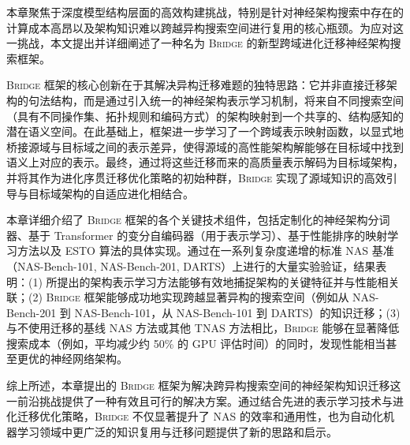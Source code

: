 \documentclass[../main.tex]{subfiles}
\begin{document}
\label{sec:ch4-10-chapter-summary}

本章聚焦于深度模型结构层面的高效构建挑战，特别是针对神经架构搜索中存在的计算成本高昂以及架构知识难以跨越异构搜索空间进行复用的核心瓶颈。为应对这一挑战，本文提出并详细阐述了一种名为 \textsc{Bridge} 的新型跨域进化迁移神经架构搜索框架。

\textsc{Bridge} 框架的核心创新在于其解决异构迁移难题的独特思路：它并非直接迁移架构的句法结构，而是通过引入统一的神经架构表示学习机制，将来自不同搜索空间（具有不同操作集、拓扑规则和编码方式）的架构映射到一个共享的、结构感知的潜在语义空间。在此基础上，框架进一步学习了一个跨域表示映射函数，以显式地桥接源域与目标域之间的表示差异，使得源域的高性能架构解能够在目标域中找到语义上对应的表示。最终，通过将这些迁移而来的高质量表示解码为目标域架构，并将其作为进化序贯迁移优化策略的初始种群，\textsc{Bridge} 实现了源域知识的高效引导与目标域架构的自适应进化相结合。

本章详细介绍了 \textsc{Bridge} 框架的各个关键技术组件，包括定制化的神经架构分词器、基于 Transformer 的变分自编码器（用于表示学习）、基于性能排序的映射学习方法以及 ESTO 算法的具体实现。通过在一系列复杂度递增的标准 NAS 基准（NAS-Bench-101, NAS-Bench-201, DARTS）上进行的大量实验验证，结果表明：(1) 所提出的架构表示学习方法能够有效地捕捉架构的关键特征并与性能相关联；(2) \textsc{Bridge} 框架能够成功地实现跨越显著异构的搜索空间（例如从 NAS-Bench-201 到 NAS-Bench-101，从 NAS-Bench-101 到 DARTS）的知识迁移；(3) 与不使用迁移的基线 NAS 方法或其他 TNAS 方法相比，\textsc{Bridge} 能够在显著降低搜索成本（例如，平均减少约 50\% 的 GPU 评估时间）的同时，发现性能相当甚至更优的神经网络架构。

综上所述，本章提出的 \textsc{Bridge} 框架为解决跨异构搜索空间的神经架构知识迁移这一前沿挑战提供了一种有效且可行的解决方案。通过结合先进的表示学习技术与进化迁移优化策略，\textsc{Bridge} 不仅显著提升了 NAS 的效率和通用性，也为自动化机器学习领域中更广泛的知识复用与迁移问题提供了新的思路和启示。
\end{document}
